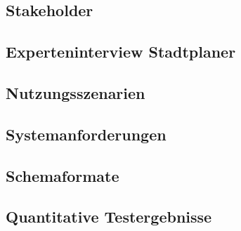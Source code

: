 
\appendix
\renewcommand{\thetable}{\Alph{subsection}.\arabic{table}}
\renewcommand{\thesubsection}{Anhang~\Alph{subsection}}

\subsection{Stakeholder}
\label{anh:Stakeholder}


\subsection{Experteninterview Stadtplaner}
\label{anh:Experteninterview Stadtplaner}


\clearpage
\subsection{Nutzungsszenarien}
\label{anh:Nutzungsszenarien}





\clearpage
\subsection{Systemanforderungen}
\label{anh:Systemanforderungen}


\clearpage
\subsection{Schemaformate}
\label{anh:Schemaformate}


\clearpage
\subsection{Quantitative Testergebnisse}
\label{anh:Quantitative Testergebnisse}



\FloatBarrier